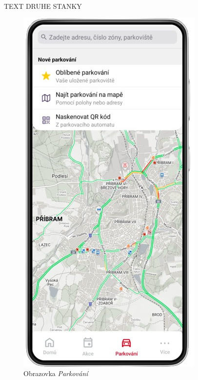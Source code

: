 \begin{minipage}[t]{0.45\textwidth}
  TEXT DRUHE STANKY
\end{minipage}
\hfill
\begin{minipage}[t]{0.45\textwidth}
  \begin{figure}[H]
    \centering
    \includegraphics[width=.7\textwidth]{screen3.png}
    \caption{Obrazovka \textit{Parkování}}
    \label{fig:mockup3}
  \end{figure}
  \begin{figure}[H]
    \centering

\end{figure}
\end{minipage}
